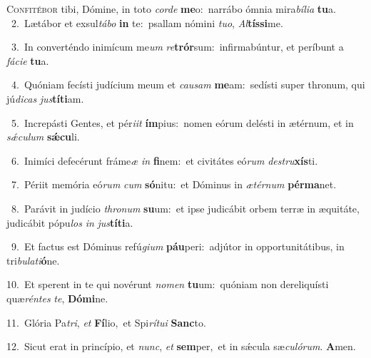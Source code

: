 \lettrine{\initial\textcolor{\initialcolor}{C}}{onfitébor} tibi, Dómine, in toto \textit{cor}\-\textit{de} \textbf{me}\-o:~\star narrábo ómnia mira\-\textit{bí}\-\textit{li}\textit{a} \textbf{tu}\-a.\\
{\numbfont\textcolor{\numbcolor}{~2.}}~Lætábor et exsul\-\textit{tá}\-\textit{bo} \textbf{in} te:~\star psallam nómini \textit{tu}\-\textit{o}, \textit{Al}\-\textbf{tís}\textbf{si}me.\par
{\numbfont\textcolor{\numbcolor}{~3.}}~In converténdo inimícum me\textit{um} \textit{re}\-\textbf{trór}sum:~\star infirmabúntur, et períbunt a \textit{fá}\-\textit{ci}\textit{e} \textbf{tu}\-a.\par
{\numbfont\textcolor{\numbcolor}{~4.}}~Quóniam fecísti judícium meum et \textit{cau}\-\textit{sam} \textbf{me}\-am:~\star sedísti super thronum, qui jú\-\textit{di}\-\textit{cas} \textit{jus}\-\textbf{tí}\textbf{ti}am.\par
{\numbfont\textcolor{\numbcolor}{~5.}}~Increpásti Gentes, et pér\-\textit{i}\-\textit{it} \textbf{ím}\-pius:~\star nomen eórum delésti in ætérnum, et in \textit{sǽ}\-\textit{cu}\textit{lum} \textbf{sǽ}\-\textbf{cu}li.\par
{\numbfont\textcolor{\numbcolor}{~6.}}~Inimíci defecérunt fráme\textit{æ} \textit{in} \textbf{fi}\-nem:~\star et civitátes eó\textit{rum} \textit{de}\-\textit{stru}\textbf{xís}ti.\par
{\numbfont\textcolor{\numbcolor}{~7.}}~Périit memória eó\textit{rum} \textit{cum} \textbf{só}\-nitu:~\star et Dóminus in \textit{æ}\-\textit{tér}\textit{num} \textbf{pér}\-\textbf{ma}net.\par
{\numbfont\textcolor{\numbcolor}{~8.}}~Parávit in judício \textit{thro}\-\textit{num} \textbf{su}\-um:~\star et ipse judicábit orbem terræ in æquitáte, judicábit pópu\textit{los} \textit{in} \textit{jus}\-\textbf{tí}\textbf{ti}a.\par
{\numbfont\textcolor{\numbcolor}{~9.}}~Et factus est Dóminus refú\-\textit{gi}\-\textit{um} \textbf{páu}\-peri:~\star adjútor in opportunitátibus, in tri\-\textit{bu}\-\textit{la}\textit{ti}\textbf{ó}ne.\par
{\numbfont\textcolor{\numbcolor}{10.}}~Et sperent in te qui novérunt \textit{no}\-\textit{men} \textbf{tu}\-um:~\star quóniam non dereliquísti quæ\-\textit{rén}\-\textit{tes} \textit{te}\-, \textbf{Dó}\-\textbf{mi}ne.\par
{\numbfont\textcolor{\numbcolor}{11.}}~Glória Pa\-\textit{tri}\-, \textit{et} \textbf{Fí}\-lio,~\star et Spi\-\textit{rí}\-\textit{tu}\textit{i} \textbf{Sanc}\-to.\par
{\numbfont\textcolor{\numbcolor}{12.}}~Sicut erat in princípio, et \textit{nunc}\-, \textit{et} \textbf{sem}\-per,~\star et in sǽcula sæ\-\textit{cu}\-\textit{ló}\textit{rum}. \textbf{A}\-men.\par
